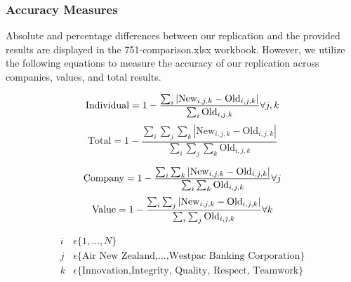 \documentclass[11pt]{article}
\begin{document}
\subsubsection{Accuracy Measures}
Absolute and percentage differences between our replication and the provided results are displayed in the 751-comparison.xlsx workbook.
However, we utilize the following equations to measure the accuracy of our replication across companies, values, and total results.
\begin{multicols}{2}
    \begin{equation}
        \text{Individual} = 1-\frac{\sum_{i}|\text{New}_{i,j,k} - \text{Old}_{i,j,k}|}{\sum_{i}\text{Old}_{i,j,k}} \space \forall j,k
    \end{equation}\break
    \begin{equation}
        \text{Total} = 1-\frac{\sum_{i}\sum_{j}\sum_{k}|\text{New}_{i,j,k} - \text{Old}_{i,j,k}|}{\sum_{i}\sum_{j}\sum_{k}\text{Old}_{i,j,k}}
    \end{equation}
\end{multicols}
\begin{multicols}{2}
    \begin{equation}
        \text{Company} = 1-\frac{\sum_{i}\sum_{k}|\text{New}_{i,j,k} - \text{Old}_{i,j,k}|}{\sum_{i}\sum_{k}\text{Old}_{i,j,k}} \space \forall j
    \end{equation}\break
    \begin{equation}
        \text{Value} = 1-\frac{\sum_{i}\sum_{j}|\text{New}_{i,j,k} - \text{Old}_{i,j,k}|}{\sum_{i}\sum_{j}\text{Old}_{i,j,k}} \space \forall k
    \end{equation}
\end{multicols}
\begin{align}
    i &\epsilon \{1,...,N\}\\
    j &\epsilon \{\text{Air New Zealand,...,Westpac Banking Corporation}\}\\
    k &\epsilon \{\text{Innovation,Integrity, Quality, Respect, Teamwork}\}
\end{align}
\end{document}
